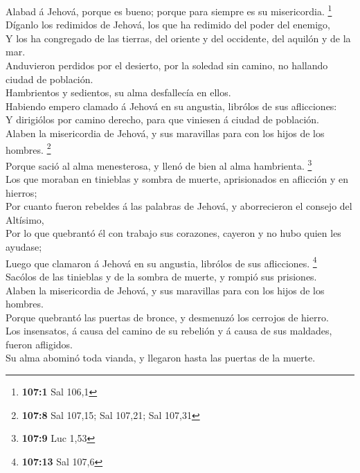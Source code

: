  Alabad á Jehová, porque es bueno; porque para siempre es su
misericordia. \footnote{\textbf{107:1} Sal 106,1}\\
 Díganlo los redimidos de Jehová, los que ha redimido del
poder del enemigo,\\
 Y los ha congregado de las tierras, del oriente y del
occidente, del aquilón y de la mar.\\
 Anduvieron perdidos por el desierto, por la soledad sin
camino, no hallando ciudad de población.\\
 Hambrientos y sedientos, su alma desfallecía en ellos.\\
 Habiendo empero clamado á Jehová en su angustia, librólos
de sus aflicciones:\\
 Y dirigiólos por camino derecho, para que viniesen á ciudad
de población.\\
 Alaben la misericordia de Jehová, y sus maravillas para con
los hijos de los hombres. \footnote{\textbf{107:8} Sal 107,15; Sal
  107,21; Sal 107,31}\\
 Porque sació al alma menesterosa, y llenó de bien al alma
hambrienta. \footnote{\textbf{107:9} Luc 1,53}\\
 Los que moraban en tinieblas y sombra de muerte,
aprisionados en aflicción y en hierros;\\
 Por cuanto fueron rebeldes á las palabras de Jehová, y
aborrecieron el consejo del Altísimo,\\
 Por lo que quebrantó él con trabajo sus corazones, cayeron
y no hubo quien les ayudase;\\
 Luego que clamaron á Jehová en su angustia, librólos de
sus aflicciones. \footnote{\textbf{107:13} Sal 107,6}\\
 Sacólos de las tinieblas y de la sombra de muerte, y
rompió sus prisiones.\\
 Alaben la misericordia de Jehová, y sus maravillas para
con los hijos de los hombres.\\
 Porque quebrantó las puertas de bronce, y desmenuzó los
cerrojos de hierro.\\
 Los insensatos, á causa del camino de su rebelión y á
causa de sus maldades, fueron afligidos.\\
 Su alma abominó toda vianda, y llegaron hasta las puertas
de la muerte.\\
